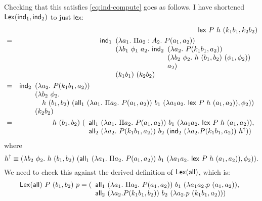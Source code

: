 \documentclass{article}
\begin{document}
Checking that this satisfies \autoref{eq:ind-compute} goes as
follows. I have shortened $\mathsf{Lex}(\mathsf{ind}_1, \mathsf{ind}_2)$ to just
$\mathsf{lex}$:
\begin{eqnarray*}
  & & \mathsf{lex}\ P\ h\ (k_1b_1,k_2b_2)
  \\
  &=&
  \ind_1
  \begin{array}[t]{l}
    (\lambda a_1.\ \Pi a_2 : A_2.\ P(a_1,a_2)) \\
    (\lambda b_1\ \phi_1\ a_2.\ \ind_2
    \begin{array}[t]{l}
      (\lambda a_2.\ P(k_1 b_1, a_2)) \\
      (\lambda b_2\ \phi_2.\ h\ (b_1, b_2)\ (\phi_1, \phi_2)) \\
      a_2)
    \end{array} \\
    (k_1 b_1)\ (k_2 b_2)
  \end{array}
  \\
  &=&
  \ind_2
  \begin{array}[t]{l}
    (\lambda a_2.\ P(k_1 b_1, a_2)) \\
    (\lambda b_2\ \phi_2.\ \\
    \quad h\ (b_1,b_2)\ (\all_1\ (\lambda a_1.\ \Pi a_2.\ P(a_1,a_2))\ b_1\ (\lambda a_1 a_2.\ \mathsf{lex}\ P\ h\ (a_1,a_2)), \phi_2)) \\
    (k_2 b_2)
  \end{array}
  \\
  &=&
  h\ (b_1,b_2)\ (
  \begin{array}[t]{l}
    \all_1\ (\lambda a_1.\ \Pi a_2.\ P(a_1,a_2))\ b_1\ (\lambda a_1 a_2.\ \mathsf{lex}\ P\ h\ (a_1,a_2)), \\
    \all_2\ (\lambda a_2.\ P(k_1 b_1, a_2))\ b_2\ (\ind_2\ (\lambda a_2. P(k_1 b_1, a_2))\ h^\dagger))
  \end{array}
\end{eqnarray*}
where
\begin{displaymath}
  h^\dagger \equiv (\lambda b_2\ \phi_2.\ h\ (b_1,b_2)\ (\mathsf{all}_1\
  (\lambda a_1.\ \Pi a_2.\ P(a_1,a_2))\ b_1\ (\lambda a_1 a_2.\
  \mathsf{lex}\ P\ h\ (a_1,a_2)), \phi_2)).
\end{displaymath}
We need to check this against the derived definition of
$\mathsf{Lex}(\mathsf{all})$, which is:
\begin{displaymath}
  \mathsf{Lex}(\all)\ P\ (b_1,b_2)\ p = (
  \begin{array}[t]{l}
    \all_1\ (\lambda a_1.\ \Pi a_2.\ P(a_1,a_2))\ b_1\ (\lambda a_1 a_2. p\ (a_1,a_2)), \\
    \all_2\ (\lambda a_2. P (k_1 b_1,b_2))\ b_2\ (\lambda a_2. p\ (k_1b_1,a_2)))
  \end{array}
\end{displaymath}
\end{document}
